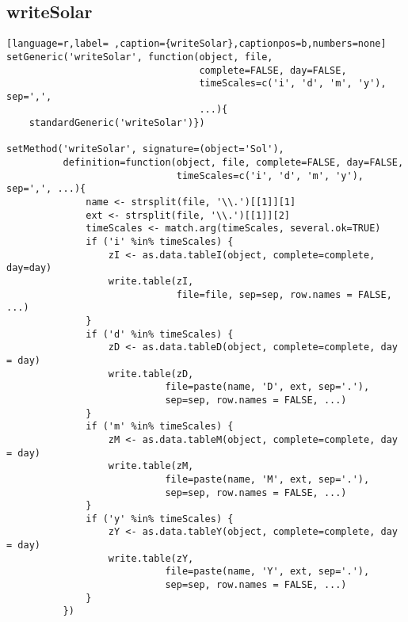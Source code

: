 \subsection{writeSolar}
\label{sec:orgf92f3b9}
\label{subsec:writesolar}
\begin{lstlisting}[language=r,label= ,caption={writeSolar},captionpos=b,numbers=none]
setGeneric('writeSolar', function(object, file,
                                  complete=FALSE, day=FALSE,
                                  timeScales=c('i', 'd', 'm', 'y'), sep=',',
                                  ...){
    standardGeneric('writeSolar')})

setMethod('writeSolar', signature=(object='Sol'),
          definition=function(object, file, complete=FALSE, day=FALSE,
                              timeScales=c('i', 'd', 'm', 'y'), sep=',', ...){
              name <- strsplit(file, '\\.')[[1]][1]
              ext <- strsplit(file, '\\.')[[1]][2]
              timeScales <- match.arg(timeScales, several.ok=TRUE)
              if ('i' %in% timeScales) {
                  zI <- as.data.tableI(object, complete=complete, day=day)
                  write.table(zI,
                              file=file, sep=sep, row.names = FALSE, ...)
              }
              if ('d' %in% timeScales) {
                  zD <- as.data.tableD(object, complete=complete, day = day)
                  write.table(zD,
                            file=paste(name, 'D', ext, sep='.'),
                            sep=sep, row.names = FALSE, ...)
              }
              if ('m' %in% timeScales) {
                  zM <- as.data.tableM(object, complete=complete, day = day)
                  write.table(zM,
                            file=paste(name, 'M', ext, sep='.'),
                            sep=sep, row.names = FALSE, ...)
              }
              if ('y' %in% timeScales) {
                  zY <- as.data.tableY(object, complete=complete, day = day)
                  write.table(zY,
                            file=paste(name, 'Y', ext, sep='.'),
                            sep=sep, row.names = FALSE, ...)
              }
          })
\end{lstlisting}
